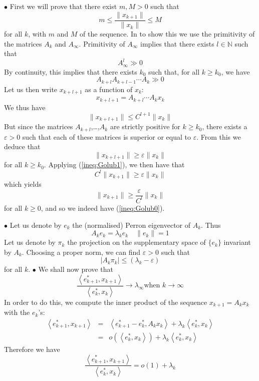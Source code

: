 \documentclass[12pt]{article}
\def\Point{$\bullet$ }
\begin{document}
\Point First we will prove that there exist $m, M>0$ such that
\begin{equation}
m\leq \frac{\|x_{k+1}\|}{\|x_k\|}\leq M
\label{ineq:Golub0}
\end{equation}
for all $k$,
with $m$ and $M$  of the sequence. In  to show this we 
use the primitivity of the matrices $A_k$ and $A_\infty$.
Primitivity of $A_\infty$ implies that there exists
$l\in\mathbb{N}$ such that
\[
A^l_\infty\gg 0
\]
By continuity, this implies that there exists $k_0$ such that, for all 
$k\geq k_0$, we have
\[
A_{k+l}A_{k+l-1}\cdots A_k\gg 0
\]
Let us then write $x_{k+l+1}$ as a function of $x_k$:
\[
x_{k+l+1}=A_{k+l}\cdots A_kx_k
\]
We thus have
\begin{equation}
\|x_{k+l+1}\|\leq C^{l+1} \|x_k\|
\label{ineq:Golub1}
\end{equation}
But since the matrices $A_{k+l}$,\ldots,$A_k$ are strictly positive
for $k\geq k_0$, there exists a $\varepsilon>0$ such that each
 of these matrices is superior or equal to 
$\varepsilon$. From this we deduce that
\[
\|x_{k+l+1}\|\geq \varepsilon \|x_k\|
\]
for all $k\geq k_0$. 
Applying  (\ref{ineq:Golub1}), we then have that
\[
C^{l} \|x_{k+1}\|\geq \varepsilon \|x_k\|
\]
which yields
\[
\|x_{k+1}\|\geq \frac{\varepsilon}{C^l}\|x_k\|
\]
for all $k\geq 0$,
and so we indeed have  (\ref{ineq:Golub0}).

\Point Let us denote by $e_k$ the (normalised) Perron eigenvector of
$A_k$. Thus
\[
A_ke_k=\lambda_ke_k\quad \|e_k\|=1
\]
Let us denote by $\pi_k$ the projection on the supplementary space of
$\{e_k\}$ invariant by $A_k$. Choosing a proper norm, we can find
$\varepsilon>0$ such that
\[
\left| A_k\pi_k \right| \leq (\lambda_k-\varepsilon)
\]
for all $k$.
\Point We shall now prove that
\[
\frac{\left<e_{k+1}^*,x_{k+1}\right>}{\left<e_k^*,x_k\right>}\to \lambda_\infty \textrm{
  when } k\to\infty
\]
In order to do this, we compute the inner product of the sequence 
$x_{k+1}=A_kx_k$ with the $e_k$'s:
\begin{eqnarray*}
\left<e_{k+1}^*,x_{k+1}\right>&=& \left<e_{k+1}^*-e_k^*,A_kx_k\right>+\lambda_k \left<e_k^*,x_k\right>
\\
&=& o\left(\left<e_k^*,x_k\right> \right)+ \lambda_k \left<e_k^*,x_k\right>
\end{eqnarray*}
Therefore we have
\[
\frac{\left<e_{k+1}^*,x_{k+1}\right>}{\left<e_k^*,x_k\right>}=o(1)+\lambda_k
\]
\end{document}
